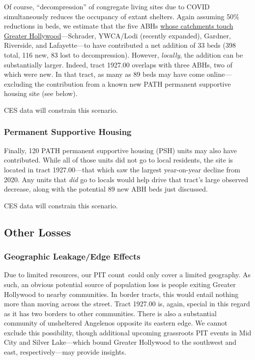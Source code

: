 \documentclass[11pt,twocolumn]{article}
\def\Count{count}
\def\resp{respectively}
\begin{document}
Of course, ``decompression'' of congregate living sites due to COVID simultaneously reduces the occupancy of extant 
shelters. Again assuming 50\% reductions in beds, we estimate that the five ABHs \href{https://arcg.is/0fy81}
{whose catchments touch Greater Hollywood}---Schrader, YWCA/Lodi (recently expanded), Gardner, Riverside, and 
Lafayette---to have contributed a net addition of 33 beds (398 total, 116 new, 83 lost to decompression). However,
{\it locally}, the addition can be substantially larger. Indeed, tract 1927.00 overlaps with three ABHs, two of which 
were new. In that tract, as many as 89 beds may have come online---excluding the contribution from a known new
PATH permanent supportive housing site (see below).

CES data will constrain this scenario.

\subsubsection{Permanent Supportive Housing}

Finally, 120 PATH permanent supportive housing (PSH) units may also have contributed. While all of those units did not 
go to local residents, the site is located in tract 1927.00---that which saw the largest year-on-year decline from 2020. Any 
units that {\it did} go to locals would help drive that tract's large observed decrease, along with the potential 89 new
ABH beds just discussed. 

CES data will constrain this scenario.

\subsection{Other Losses}

\subsubsection{Geographic Leakage/Edge Effects}

Due to limited resources, our PIT \Count\ could only cover a limited geography. As such, an obvious potential source
of population loss is people exiting Greater Hollywood to nearby communities. In border tracts, this would entail nothing
more than moving across the street. Tract 1927.00 is, again, special in this regard as it has two borders to other communities.
There is also a substantial community of unsheltered Angelenos opposite its eastern edge. We cannot exclude this possibility,
though additional upcoming grassroots PIT events in Mid City and Silver Lake---which bound Greater Hollywood to the
southwest and east, \resp---may provide insights.
\end{document}
